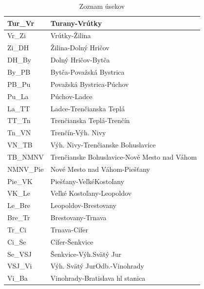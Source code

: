 \documentclass[11pt,a4paper]{article}
\begin{document}
\begin{table}[H]
\begin{tabular}{|l|l|}
    Tur\_Vr       & Turany-Vrútky                                \\ \hline
    Vr\_Zi        & Vrútky-Žilina                                \\ \hline
    Zi\_DH        & Žilina-Dolný Hričov                          \\ \hline
    DH\_By        & Dolný Hričov-Bytča                           \\ \hline
    By\_PB        & Bytča-Považská Bystrica                      \\ \hline
    PB\_Pu        & Považská Bystrica-Púchov                     \\ \hline
    Pu\_La        & Púchov-Ladce                                 \\ \hline
    La\_TT        & Ladce-Trenčianska Teplá                      \\ \hline
    TT\_Tn        & Trenčianska Teplá-Trenčín                    \\ \hline
    Tn\_VN        & Trenčín-Výh. Nivy                            \\ \hline
    VN\_TB        & Výh. Nivy-Trenčianske Bohuslavice            \\ \hline
    TB\_NMNV      & Trenčianske Bohuslavice-Nové Mesto nad Váhom \\ \hline
    NMNV\_Pie     & Nové Mesto nad Váhom-Piešťany                \\ \hline
    Pie\_VK       & Piešťany-VeľkéKostoľany                      \\ \hline
    VK\_Le        & Veľké Kostoľany-Leopoldov                    \\ \hline
    Le\_Bre       & Leopoldov-Brestovany                         \\ \hline
    Bre\_Tr       & Brestovany-Trnava                            \\ \hline
    Tr\_Ci        & Trnava-Cífer                                 \\ \hline
    Ci\_Se        & Cífer-Šenkvice                               \\ \hline
    Se\_VSJ       & Šenkvice-Výh.Svätý Jur                       \\ \hline
    VSJ\_Vi       & Výh. Svätý JurOdb.-Vinohrady                 \\ \hline
    Vi\_Ba        & Vinohrady-Bratislava hl stanica              \\ \hline
    \end{tabular}
    \caption{Zoznam úsekov}
    \label{tab:USEKY}
\end{table}
\end{document}

